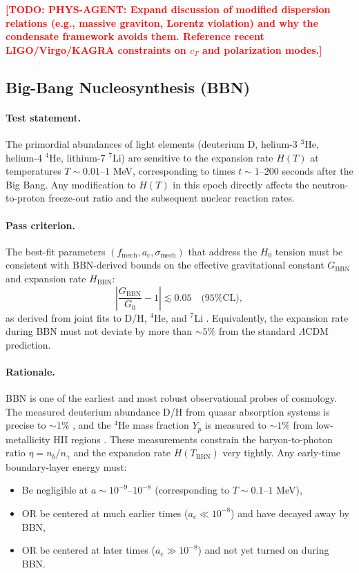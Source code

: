 \documentclass[11pt,a4paper]{article}
\newcommand{\ac}{a_{\mathrm{c}}}
\newcommand{\sigmamech}{\sigma_{\mathrm{mech}}}
\newcommand{\fmech}{f_{\mathrm{mech}}}
\theoremstyle{definition}
\newcommand{\TODO}[1]{\textcolor{red}{\textbf{[TODO: #1]}}}
\begin{document}
\TODO{PHYS-AGENT: Expand discussion of modified dispersion relations (e.g., massive graviton, Lorentz violation) and why the condensate framework avoids them. Reference recent LIGO/Virgo/KAGRA constraints on $c_T$ and polarization modes.}

\subsection{Big-Bang Nucleosynthesis (BBN)}
\label{sec:BBN}

\paragraph{Test statement.}
The primordial abundances of light elements (deuterium D, helium-3 $^3$He, helium-4 $^4$He, lithium-7 $^7$Li) are sensitive to the expansion rate $H(T)$ at temperatures $T \sim 0.01$--$1$ MeV, corresponding to times $t \sim 1$--$200$ seconds after the Big Bang. Any modification to $H(T)$ in this epoch directly affects the neutron-to-proton freeze-out ratio and the subsequent nuclear reaction rates.

\paragraph{Pass criterion.}
The best-fit parameters $(\fmech, \ac, \sigmamech)$ that address the $H_0$ tension must be consistent with BBN-derived bounds on the effective gravitational constant $G_{\mathrm{BBN}}$ and expansion rate $H_{\mathrm{BBN}}$:
\begin{equation}
\label{eq:BBN_G_bound}
\left| \frac{G_{\mathrm{BBN}}}{G_0} - 1 \right| \lesssim 0.05 \quad \text{(95\% CL)},
\end{equation}
as derived from joint fits to D/H, $^4$He, and $^7$Li \cite{BBN_Gbounds,PDG_BBN}. Equivalently, the expansion rate during BBN must not deviate by more than $\sim 5\%$ from the standard $\Lambda$CDM prediction.

\paragraph{Rationale.}
BBN is one of the earliest and most robust observational probes of cosmology. The measured deuterium abundance D/H from quasar absorption systems is precise to $\sim 1\%$ \cite{Cooke_D2014}, and the $^4$He mass fraction $Y_p$ is measured to $\sim 1\%$ from low-metallicity HII regions \cite{AdesOlivares_He2020}. These measurements constrain the baryon-to-photon ratio $\eta = n_b/n_\gamma$ and the expansion rate $H(T_{\mathrm{BBN}})$ very tightly. Any early-time boundary-layer energy must:
\begin{itemize}[leftmargin=1.8em]
  \item Be negligible at $a \sim 10^{-9}$--$10^{-8}$ (corresponding to $T \sim 0.1$--$1$ MeV),
  \item OR be centered at much earlier times ($\ac \ll 10^{-8}$) and have decayed away by BBN,
  \item OR be centered at later times ($\ac \gg 10^{-8}$) and not yet turned on during BBN.
\end{itemize}
\end{document}
